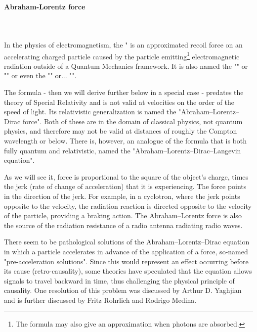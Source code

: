 	\paragraph{Abraham-Lorentz force}\mbox{}\\\\
	In the physics of electromagnetism, the " is an approximated recoil force on an accelerating charged particle caused by the particle emitting\footnote{The formula may also give an approximation when photons are absorbed.} electromagnetic radiation outside of a Quantum Mechanics framework. It is also named the "" or "" or even the "" or... "".
	
	The formula - then we will derive further below in a special case - predates the theory of Special Relativity and is not valid at velocities on the order of the speed of light. Its relativistic generalization is named the "Abraham–Lorentz–Dirac force". Both of these are in the domain of classical physics, not quantum physics, and therefore may not be valid at distances of roughly the Compton wavelength or below. There is, however, an analogue of the formula that is both fully quantum and relativistic, named the "Abraham–Lorentz–Dirac–Langevin equation".

	As we will see it, force is proportional to the square of the object's charge, times the jerk (rate of change of acceleration) that it is experiencing. The force points in the direction of the jerk. For example, in a cyclotron, where the jerk points opposite to the velocity, the radiation reaction is directed opposite to the velocity of the particle, providing a braking action. The Abraham–Lorentz force is also the source of the radiation resistance of a radio antenna radiating radio waves.

	\begin{tcolorbox}[title=Remark,colframe=black,arc=10pt]
	There seem to be pathological solutions of the Abraham–Lorentz–Dirac equation in which a particle accelerates in advance of the application of a force, so-named "pre-acceleration solutions". Since this would represent an effect occurring before its cause (retro-causality), some theories have speculated that the equation allows signals to travel backward in time, thus challenging the physical principle of causality. One resolution of this problem was discussed by Arthur D. Yaghjian and is further discussed by Fritz Rohrlich and Rodrigo Medina.
	\end{tcolorbox}
	
